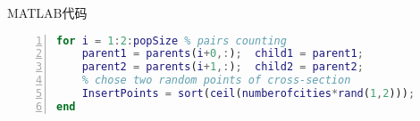 \documentclass{beamer}
\begin{document}
\begin{frame}[fragile]
\begin{block}{MATLAB代码}
\begin{lstlisting}[language={matlab},
                   numbers=left,
                   numberstyle=\tiny\menlo,
                   basicstyle=\small\menlo]
for i = 1:2:popSize % pairs counting
    parent1 = parents(i+0,:);  child1 = parent1;
    parent2 = parents(i+1,:);  child2 = parent2;
    % chose two random points of cross-section
    InsertPoints = sort(ceil(numberofcities*rand(1,2)));
end
\end{lstlisting}
\end{block}
\end{frame}
\end{document}
